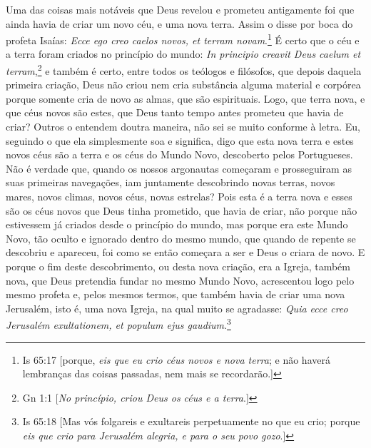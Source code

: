 Uma das coisas mais notáveis que Deus revelou e prometeu antigamente foi
que ainda havia de criar um novo céu, e uma nova terra. Assim o disse
por boca do profeta Isaías: \emph{Ecce ego creo caelos novos, et terram
novam}.\footnote{Is 65:17 [porque, \emph{eis que eu crio céus novos e nova terra}; e não haverá lembranças das coisas passadas, nem mais se recordarão.]} É certo que o céu e a terra foram criados no
princípio do mundo: \emph{In principio creavit Deus caelum et terram},\footnote{Gn 1:1 [\emph{No princípio, criou Deus os céus e a terra}.]}
e também é certo, entre todos os teólogos
e filósofos, que depois daquela primeira criação, Deus não criou nem
cria substância alguma material e corpórea porque somente cria de novo
as almas, que são espirituais. Logo, que terra nova, e que céus novos
são estes, que Deus tanto tempo antes prometeu que havia de criar?
Outros o entendem doutra maneira, não sei se muito conforme à letra. Eu,
seguindo o que ela simplesmente soa e significa, digo que esta nova
terra e estes novos céus são a terra e os céus do Mundo Novo, descoberto
pelos Portugueses. Não é verdade que, quando os nossos argonautas
começaram e prosseguiram as suas primeiras navegações, iam juntamente
descobrindo novas terras, novos mares, novos climas, novos céus, novas
estrelas? Pois esta é a terra nova e esses são os céus novos que Deus
tinha prometido, que havia de criar, não porque não estivessem já
criados desde o princípio do mundo, mas porque era este Mundo Novo, tão
oculto e ignorado dentro do mesmo mundo, que quando de repente se
descobriu e apareceu, foi como se então começara a ser e Deus o criara
de novo. E porque o fim deste descobrimento, ou desta nova criação, era
a Igreja, também nova, que Deus pretendia fundar no mesmo Mundo Novo,
acrescentou logo pelo mesmo profeta e, pelos mesmos termos, que também
havia de criar uma nova Jerusalém, isto é, uma nova Igreja, na qual
muito se agradasse: \emph{Quia ecce creo Jerusalém exultationem, et
populum ejus gaudium}.\footnote{Is 65:18 [Mas vós folgareis e exultareis perpetuamente no que eu crio; porque \emph{eis que crio para Jerusalém alegria, e para o seu povo gozo}.]}

